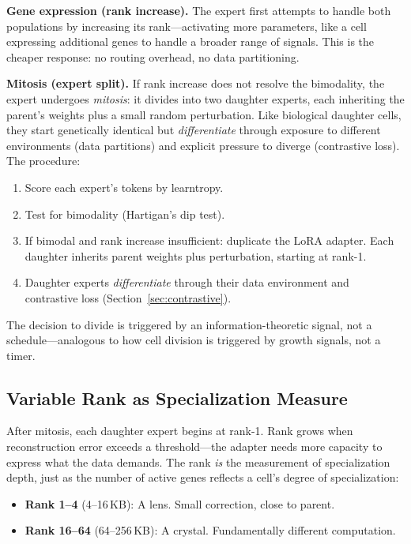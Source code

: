 \documentclass{article}
\begin{document}
\textbf{Gene expression (rank increase).} The expert first attempts to handle both populations by increasing its rank---activating more parameters, like a cell expressing additional genes to handle a broader range of signals. This is the cheaper response: no routing overhead, no data partitioning.

\textbf{Mitosis (expert split).} If rank increase does not resolve the bimodality, the expert undergoes \emph{mitosis}: it divides into two daughter experts, each inheriting the parent's weights plus a small random perturbation. Like biological daughter cells, they start genetically identical but \emph{differentiate} through exposure to different environments (data partitions) and explicit pressure to diverge (contrastive loss). The procedure:
\begin{enumerate}
    \item Score each expert's tokens by learntropy.
    \item Test for bimodality (Hartigan's dip test).
    \item If bimodal and rank increase insufficient: duplicate the LoRA adapter.
          Each daughter inherits parent weights plus perturbation, starting at rank-1.
    \item Daughter experts \emph{differentiate} through their data environment and contrastive loss (Section~\ref{sec:contrastive}).
\end{enumerate}
The decision to divide is triggered by an information-theoretic signal, not a schedule---analogous to how cell division is triggered by growth signals, not a timer.

\subsection{Variable Rank as Specialization Measure}

After mitosis, each daughter expert begins at rank-1. Rank grows when reconstruction
error exceeds a threshold---the adapter needs more capacity to express what the
data demands. The rank \emph{is} the measurement of specialization depth, just as the number of active genes reflects a cell's degree of specialization:
\begin{itemize}
    \item \textbf{Rank 1--4} (4--16\,KB): A lens. Small correction, close to parent.
    \item \textbf{Rank 16--64} (64--256\,KB): A crystal. Fundamentally different
          computation.
\end{itemize}
\end{document}
